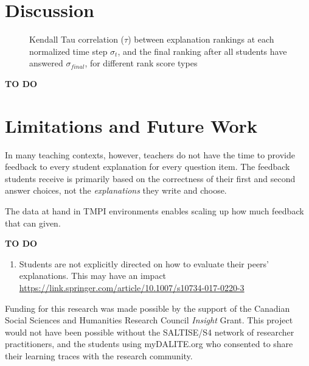 \documentclass[acmsmall]{acmart}
\begin{document}
%






\section{Discussion}

\begin{figure}
	\scalebox{0.6}{}
	\caption{
		Kendall Tau correlation ($\tau$) between explanation rankings at each 
		normalized time step $\sigma_t$, and the final ranking after all 
		students have answered $\sigma_{final}$, for different rank score types
	}
	\label{fig:kendalltau_by_time}
\end{figure}


\textbf{TO DO}


\section{Limitations and Future Work}


In many teaching contexts, however, teachers do not have the time to provide 
feedback to every student explanation for every question item. 
The feedback students receive is primarily based on the correctness of their 
first and second answer choices, not the \textit{explanations} they write and 
choose.

The data at hand in TMPI environments enables scaling up how much feedback that 
can given.



\textbf{TO DO}

\begin{enumerate}
	\item Students are not explicitly directed on how to evaluate their peers' 
	explanations. This may have an impact 
	 \url{https://link.springer.com/article/10.1007/s10734-017-0220-3}
\end{enumerate}

\begin{acks}
Funding for this research was made possible by the support of the Canadian 
Social Sciences and Humanities Research Council \textit{Insight} Grant. This 
project would not have been possible without the SALTISE/S4 network of 
researcher practitioners, and the students using myDALITE.org who consented to 
share their learning traces with the research community.
\end{acks}







\end{document}
